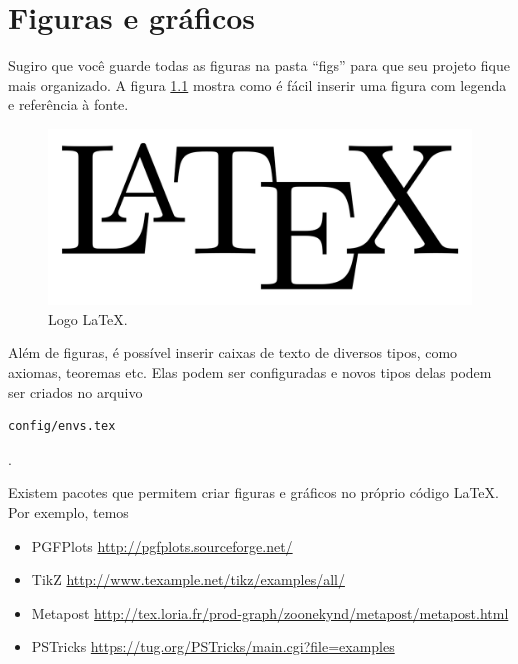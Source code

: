 \chapter{Figuras e gráficos}

\thispagestyle{empty} 

Sugiro que você guarde todas as figuras na pasta ``figs'' para que seu projeto fique mais organizado. A figura \ref{fig:logolatex} mostra como é fácil inserir uma figura com legenda e referência à fonte.

\begin{figure}
	\centering
	\begin{minipage}{0.6\linewidth}
		\centering
		\caption{Logo \LaTeX.}
		\label{fig:logolatex}
		\includegraphics[width=\linewidth]{figs/1280px-LaTeX-logo.png}
	\end{minipage}
\end{figure}

Além de figuras,  é possível inserir caixas de texto de diversos tipos, como axiomas, teoremas etc. Elas podem ser configuradas e novos tipos delas podem ser criados no arquivo \begin{verbatim}config/envs.tex\end{verbatim}.

Existem pacotes que permitem criar figuras e gráficos no próprio código \LaTeX. Por exemplo, temos

\begin{itemize}
    \item PGFPlots \url{http://pgfplots.sourceforge.net/}
    \item TikZ \url{http://www.texample.net/tikz/examples/all/}
    \item Metapost \url{http://tex.loria.fr/prod-graph/zoonekynd/metapost/metapost.html}
    \item PSTricks \url{https://tug.org/PSTricks/main.cgi?file=examples}
\end{itemize}


